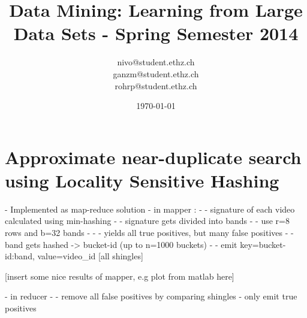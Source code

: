 \documentclass[a4paper, 11pt]{article}
\title{Data Mining: Learning from Large Data Sets - Spring Semester 2014}
\author{nivo@student.ethz.ch\\ ganzm@student.ethz.ch\\ rohrp@student.ethz.ch\\}
\date{\today}
\begin{document}
\maketitle

\section*{Approximate near-duplicate search using Locality Sensitive
Hashing} 

- Implemented as map-reduce solution
- in mapper : 
- - signature of each video calculated using min-hashing
- - signature gets divided into bands
- - use r=8 rows and b=32 bands
- - - yields all true positives, but many false positives
- - band gets hashed -> bucket-id (up to n=1000 buckets)
- - emit key=bucket-id:band, value=video\_id [all shingles]

[insert some nice results of mapper, e.g plot from matlab here]


- in reducer
- - remove all false positives by comparing shingles
  - only emit true positives
\end{document}
